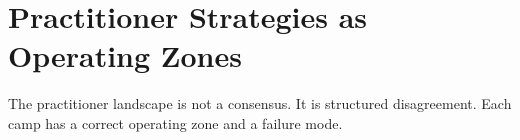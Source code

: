 \documentclass[
  11pt,
  letterpaper,
  numbers=noendperiod,
  parskip=half]{scrartcl}
\begin{document}
\iffalse
\section{Practitioner Strategies as Operating
Zones}\label{sec-practitioner}

The practitioner landscape is not a consensus. It is structured
disagreement. Each camp has a correct operating zone and a failure mode.
\end{document}
